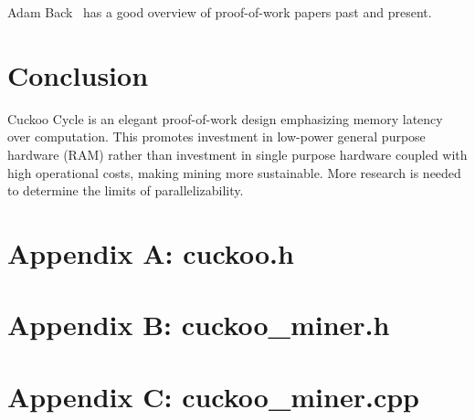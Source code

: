 \documentclass[11pt, oneside]{article}
\begin{document}
Adam Back~\cite{back2014} has a good overview of proof-of-work papers past
and present.

\section{Conclusion}
Cuckoo Cycle is an elegant proof-of-work design emphasizing memory latency
over computation.  This promotes investment in low-power general purpose
hardware (RAM) rather than investment in single purpose hardware coupled with
high operational costs, making mining more sustainable.  More research is
needed to determine the limits of parallelizability.




\lstset{language=C,basicstyle=\footnotesize}
\section{Appendix A: cuckoo.h}


\section{Appendix B: cuckoo\_miner.h}


\section{Appendix C: cuckoo\_miner.cpp}

\end{document}
